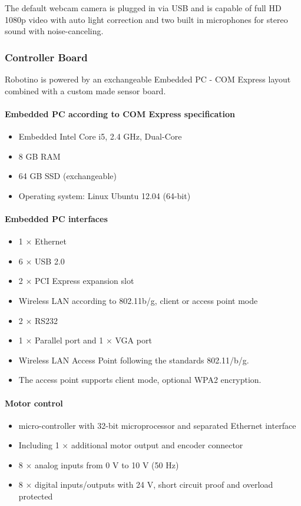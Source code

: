 \documentclass[12pt,twoside]{article}
\begin{document}
\begin{appendix}
The default webcam camera is plugged in via USB and is capable of full
HD 1080p video with auto light correction and two built in microphones
for stereo sound with noise-canceling.

\subsubsection{Controller Board}
Robotino is powered by an exchangeable Embedded PC - COM Express
layout combined with a custom made sensor board.

\paragraph{Embedded PC according to COM Express specification}
\begin{itemize}
\item Embedded Intel Core i5, 2.4 GHz, Dual-Core
\item 8 GB RAM
\item 64 GB SSD (exchangeable) 
\item Operating system: Linux Ubuntu 12.04 (64-bit)
\end{itemize}

\paragraph{Embedded PC interfaces}
\begin{itemize}
\item 1 $\times$ Ethernet
\item 6 $\times$ USB 2.0
\item 2 $\times$ PCI Express expansion slot
\item Wireless LAN according to 802.11b/g, client or access point mode
\item 2 $\times$  RS232
\item 1 $\times$ Parallel port and 1 $\times$ VGA port
\item Wireless LAN Access Point following the standards 802.11/b/g.
\item The access point supports client mode, optional WPA2 encryption.
\end{itemize}

\paragraph{Motor control}
\begin{itemize}
\item micro-controller with 32-bit microprocessor and separated
  Ethernet interface
\item Including 1 $\times$ additional motor output and encoder
  connector
\item 8 $\times$ analog inputs from 0 V to 10 V (50 Hz)
\item 8 $\times$ digital inputs/outputs with 24 V, short circuit proof
  and overload protected
\end{itemize}


\end{appendix}
\end{document}
